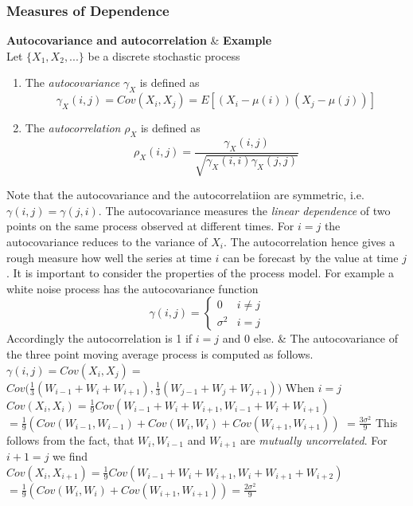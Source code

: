 \subsubsection{Measures of Dependence}
{
	
	\begin{twoColTable}
	\hline
	\textbf{Autocovariance and autocorrelation}
	& \textbf{Example}\\
	\hline
	Let $\{X_1,X_2,...\}$ be a discrete stochastic process
	\begin{enumerate}
		\item The \textit{autocovariance} $\gamma_X$ is defined as
		$$\gamma_X(i,j)=Cov(X_i,X_j)= E[(X_i-\mu(i))(X_j-\mu(j))]	$$
		\item The \textit{autocorrelation} $\rho_X$ is defined as
		$$ \rho_X(i,j)=\frac{\gamma_X(i,j)}{\sqrt{\gamma_X(i,i)\gamma_X(j,j)}}$$
	\end{enumerate}
		Note that the autocovariance and the autocorrelatiion are symmetric, i.e. $\gamma(i,j)=\gamma(j,i)$. The autocovariance measures the \textit{linear dependence} of two points on the same process observed at different times. For $i=j$ the autocovariance reduces to the variance of $X_i$.\vfill
		\hfill
		\break
		The autocorrelation hence gives a rough measure how well the series at time $i$ can be forecast by the value at time $j$.
		\vfill
		\hfill
		\break
		It is important to consider the properties of the process model. For example a white noise process has the autocovariance function
		$$
		\gamma(i,j)=
		\begin{cases}
		0 & i\neq j\\
		\sigma^2 & i = j
		\end{cases}
		$$
		Accordingly the autocorrelation is 1 if $i=j$ and 0 else.
	& 
	The autocovariance of the three point moving average process is computed as follows.\vfill
	{\centering	$\gamma(i,j)=Cov(X_i,X_j)=$\vfill} {\centering	$Cov\bigg(\frac{1}{3}(W_{i-1}+W_i+W_{i+1}),\frac{1}{3}(W_{j-1}+W_j+W_{j+1})\bigg) $\vfill}
	When $i=j$\vfill
	{\centering$Cov(X_i,X_i)=\frac{1}{9}Cov(W_{i-1}+W_i+W_{i+1},W_{i-1}+W_i+W_{i+1})$\vfill}
	{\centering$=\frac{1}{9}(Cov(W_{i-1},W_{i-1})+Cov(W_{i},W_{i})+Cov(W_{i+1},W_{i+1}))$\vfill}
	{\centering$=\frac{3\sigma^2}{9}$\vfill}
	This follows from the fact, that $W_i,W_{i-1}$ and $W_{i+1}$ are \textit{mutually uncorrelated}. For $i+1 = j$ we find\vfill
	{\centering$Cov(X_i,X_{i+1})=\frac{1}{9}Cov(W_{i-1}+W_i+W_{i+1},W_{i}+W_{i+1}+W_{i+2})$\vfill}
	{\centering$=\frac{1}{9}(Cov(W_{i},W_{i})+Cov(W_{i+1},W_{i+1}))=\frac{2\sigma^2}{9}$\vfill}

\end{twoColTable}}
